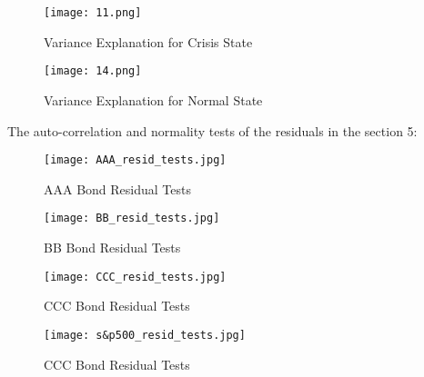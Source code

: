 \documentclass[12pt]{article}
\begin{document}
\begin{figure}[H]
\centering
\texttt{[image: 11.png]}\\
\caption{Variance Explanation for Crisis State}
\end{figure}

\begin{figure}[H]
\centering
\texttt{[image: 14.png]}\\
\caption{Variance Explanation for Normal State}
\end{figure}

The auto-correlation and normality tests of the residuals in the section 5:

\begin{figure}[H]
\centering
\texttt{[image: AAA\_resid\_tests.jpg]}\\
\caption{AAA Bond Residual Tests}
\end{figure}


\begin{figure}[H]
\centering
\texttt{[image: BB\_resid\_tests.jpg]}\\
\caption{BB Bond Residual Tests}
\end{figure}


\begin{figure}[H]
\centering
\texttt{[image: CCC\_resid\_tests.jpg]}\\
\caption{CCC Bond Residual Tests}
\end{figure}

\begin{figure}[H]
\centering
\texttt{[image: s\&p500\_resid\_tests.jpg]}\\
\caption{CCC Bond Residual Tests}
\end{figure}
\end{document}
